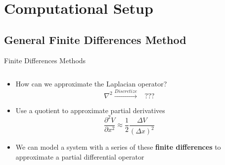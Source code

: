\documentclass{beamer}
\begin{document}
\section{Computational Setup}
\subsection{General Finite Differences Method}
\begin{frame}{Finite Differences Methods}
\begin{columns}
    \begin{column}{0.6\textwidth}
        \begin{itemize}
            \item <1-> How can we approximate the Laplacian operator?
            \begin{equation*}
                \nabla^2 \xrightarrow{Discretize} \;\;\; ???
            \end{equation*}
            \item <2-> Use a quotient to approximate partial derivatives
            \begin{equation}
                \frac{\partial^2 V}{\partial x^2} \approx \frac{1}{2} \frac{\Delta V}{(\Delta x)^2}
            \end{equation}
            \item<2-> We can model a system with a series of these \textbf{finite differences} to approximate a partial differential operator
        \end{itemize}
    \end{column}
    \begin{column}{0.4\textwidth}




\end{column}
\end{columns}
\end{frame}
\end{document}
